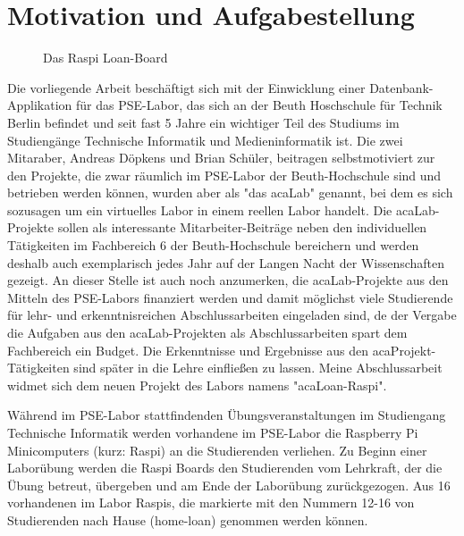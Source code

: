 \section{Motivation und Aufgabestellung}
\label{sec:intro:motivation}
\begin{figure}
	\caption{Das Raspi Loan-Board }
	\label{fig:click}
\end{figure}
Die vorliegende Arbeit beschäftigt sich mit der Einwicklung einer Datenbank-Applikation für das PSE-Labor\cite{website:17}, das sich an der Beuth Hoschschule für Technik Berlin befindet und seit fast 5 Jahre ein wichtiger Teil des Studiums im Studiengänge Technische Informatik und Medieninformatik ist. Die zwei Mitaraber, Andreas Döpkens und Brian Schüler, beitragen selbstmotiviert zur den  Projekte, die zwar räumlich im PSE-Labor der Beuth-Hochschule sind und betrieben werden können\cite{website:1}, wurden aber als "das acaLab" genannt, bei dem es sich sozusagen um ein virtuelles Labor in einem reellen Labor handelt. Die acaLab-Projekte sollen als interessante Mitarbeiter-Beiträge neben den individuellen Tätigkeiten im Fachbereich 6 der Beuth-Hochschule bereichern und werden deshalb auch exemplarisch jedes Jahr auf der Langen Nacht der Wissenschaften gezeigt\cite{website:1}. An dieser Stelle ist auch noch anzumerken, die acaLab-Projekte aus den Mitteln des PSE-Labors finanziert werden und damit möglichst viele Studierende für lehr- und erkenntnisreichen Abschlussarbeiten eingeladen sind, de der Vergabe die Aufgaben aus den acaLab-Projekten als Abschlussarbeiten spart dem Fachbereich ein Budget. Die Erkenntnisse und Ergebnisse aus den acaProjekt-Tätigkeiten sind später in die Lehre einfließen zu lassen.\cite{website:1} Meine Abschlussarbeit widmet sich dem neuen Projekt des Labors namens "acaLoan-Raspi".

Während im PSE-Labor stattfindenden Übungsveranstaltungen im Studiengang Technische Informatik werden vorhandene im PSE-Labor die Raspberry Pi Minicomputers (kurz: Raspi)  an die Studierenden verliehen. Zu Beginn einer Laborübung werden die Raspi Boards den Studierenden vom Lehrkraft, der die Übung betreut, übergeben und am Ende der Laborübung zurückgezogen. Aus 16 vorhandenen im Labor Raspis, die markierte mit den Nummern 12-16 von Studierenden nach Hause (home-loan) genommen werden können.\cite{website:1} 

